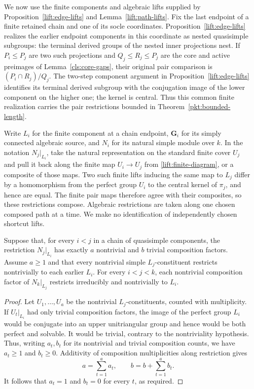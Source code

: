 We now use the finite components and algebraic lifts supplied by
Proposition~\ref{lift:edge-lifts} and Lemma~\ref{lift:path-lifts}.
Fix the last endpoint of a finite retained chain and one of its socle
coordinates.  Proposition~\ref{lift:edge-lifts} realizes the earlier endpoint
components in this coordinate as nested quasisimple subgroups: the terminal
derived groups of the nested inner projections nest.  If $P_i\le P_j$ are
two such projections and $Q_j\le R_j\le P_j$ are the core and active
preimages of Lemma~\ref{cls:core-gaps}, their original pair comparison is
$(P_i\cap R_j)/Q_j$.  The two-step component argument in
Proposition~\ref{lift:edge-lifts} identifies its terminal derived subgroup
with the conjugation image of the lower component on the higher one;
the kernel is central.  Thus this common finite realization carries the
pair restrictions bounded in Theorem~\ref{pkt:bounded-length}.

Write $L_i$ for the finite component at a chain endpoint,
$\mathbf G_i$ for its simply connected algebraic source, and $N_i$ for
its natural simple module over $k$.
In the notation $N_j|_{L_i}$, take the natural representation on the
standard finite cover $U_j$ and pull it back along the finite map
$U_i\to U_j$ from \eqref{lift:finite-diagram}, or a composite of those maps.
Two such finite lifts inducing the same map to $L_j$ differ by a
homomorphism from the perfect group $U_i$ to the central kernel of
$\pi_j$, and hence are equal.  The finite pair maps therefore agree with
their composites, so these restrictions compose.
Algebraic restrictions are taken along one chosen
composed path at a time.  We make no identification of independently chosen
shortcut lifts.

\begin{lemma}
\label{irr:constituent-count}
Suppose that, for every $i<j$ in a chain of quasisimple components, the
restriction $N_j|_{L_i}$ has exactly $a$ nontrivial and $b$ trivial
composition factors.  Assume $a\geq1$ and that every nontrivial simple
$L_j$-constituent restricts nontrivially to each earlier $L_i$.
For every $i<j<k$, each nontrivial composition factor of $N_k|_{L_j}$
restricts irreducibly and nontrivially to $L_i$.
\end{lemma}

\begin{proof}
Let $U_1,\ldots,U_a$ be the nontrivial $L_j$-constituents, counted with
multiplicity.  If $U_t|_{L_i}$ had only trivial composition factors, the
image of the perfect group $L_i$ would be conjugate into an upper unitriangular
group and hence would be both perfect and solvable.  It would be trivial,
contrary to the nontriviality hypothesis.  Thus, writing $a_t,b_t$ for its
nontrivial and trivial composition counts, we have $a_t\geq1$ and $b_t\geq0$.
Additivity of composition multiplicities along restriction gives
\[
 a=\sum_{t=1}^a a_t,\qquad
 b=b+\sum_{t=1}^a b_t.
\]
It follows that $a_t=1$ and $b_t=0$ for every $t$, as required.
\end{proof}

